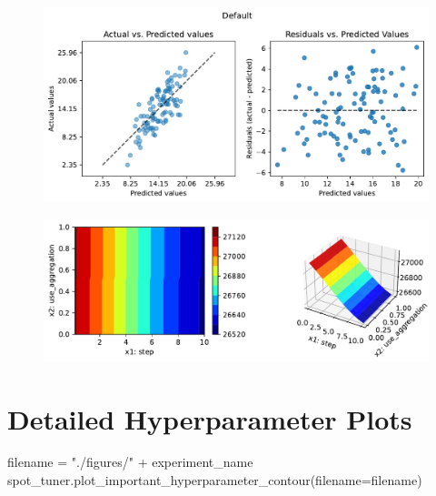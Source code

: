 \documentclass[
  letterpaper,
  DIV=11,
  numbers=noendperiod]{scrreprt}
\newenvironment{Shaded}{\begin{snugshade}}{\end{snugshade}}
\newcommand{\NormalTok}[1]{\textcolor[rgb]{0.00,0.23,0.31}{#1}}
\newcommand{\OperatorTok}[1]{\textcolor[rgb]{0.37,0.37,0.37}{#1}}
\newcommand{\StringTok}[1]{\textcolor[rgb]{0.13,0.47,0.30}{#1}}
\begin{document}
\begin{figure}[H]

{\centering \includegraphics{025_spot_hpt_river_friedman_amfr_files/figure-pdf/cell-36-output-1.pdf}

}

\end{figure}

\begin{figure}[H]

{\centering \includegraphics{025_spot_hpt_river_friedman_amfr_files/figure-pdf/cell-36-output-2.pdf}

}

\end{figure}

\hypertarget{detailed-hyperparameter-plots-6}{%
\section{Detailed Hyperparameter
Plots}\label{detailed-hyperparameter-plots-6}}

\begin{Shaded}
\begin{Highlighting}[]
\NormalTok{filename }\OperatorTok{=} \StringTok{"./figures/"} \OperatorTok{+}\NormalTok{ experiment\_name}
\NormalTok{spot\_tuner.plot\_important\_hyperparameter\_contour(filename}\OperatorTok{=}\NormalTok{filename)}
\end{Highlighting}
\end{Shaded}
\end{document}
